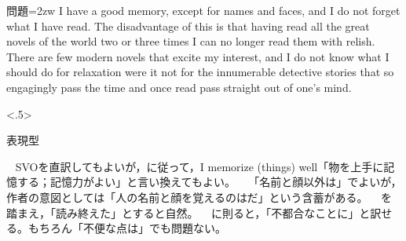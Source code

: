 \documentclass[dvipdfmx,b5j,10pt]{jsarticle}%
\begin{document}
%

\begin{ascolorbox4}{問題}\parindent=2zw
I have a good memory, except for names and faces, and I do not forget what I have read. The disadvantage of this is that having read all the great novels of the world two or three times I can no longer read them with relish. There are few modern novels that excite my interest, and I do not know what I should do for relaxation were it not for the innumerable detective stories that so engagingly pass the time and once read pass straight out of one's mind.
\end{ascolorbox4}%
\begin{chuushaku}[.7]<.5>
\begin{鉄壁カラーボックス}{\!\!表現型\!\!}\noindent{}\end{鉄壁カラーボックス}%
~%
SVOを直訳してもよいが，\noindent に従って，I memorize (things) well「物を上手に記憶する；記憶力がよい」と言い換えてもよい。%
~%
「名前と顔以外は」でよいが，作者の意図としては「人の名前と顔を覚えるのはだ」という含蓄がある。%
~%
\noindent を踏まえ，「読み終えた」とすると自然。%
~%
%
\noindent に則ると，「不都合なことに」と訳せる。もちろん「不便な点は」でも問題ない。%
\end{chuushaku}
\end{document}
